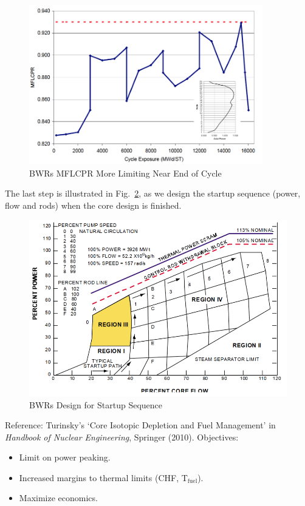 \documentclass{school-22.211-notes}
\begin{document}
\begin{enumerate}
  \begin{figure}[ht]
    \centering
    \includegraphics[width=4in]{images/design/BWR-limiting-end.png}
    \caption{BWRs MFLCPR More Limiting Near End of Cycle} \label{BWR-end} 
    \end{figure}
\end{enumerate}



The last step is illustrated in Fig.~\ref{BWR-startup}, as we design the startup sequence (power, flow and rods) when the core design is finished.
  \begin{figure}[ht]
    \centering
    \includegraphics[width=6in]{images/design/BWR-startup-seq.png}
    \caption{BWRs Design for Startup Sequence} \label{BWR-startup} 
    \end{figure}


\clearpage
{} 

Reference: Turinsky's `Core Isotopic Depletion and Fuel Management' in
\textit{Handbook of Nuclear Engineering}, Springer (2010). Objectives: 
\begin{itemize}
\item Limit on power peaking. 
\item Increased margins to thermal limits (CHF, T$_{\mathrm{fuel}}$). 
\item Maximize economics. 
\end{itemize}
\end{document}
